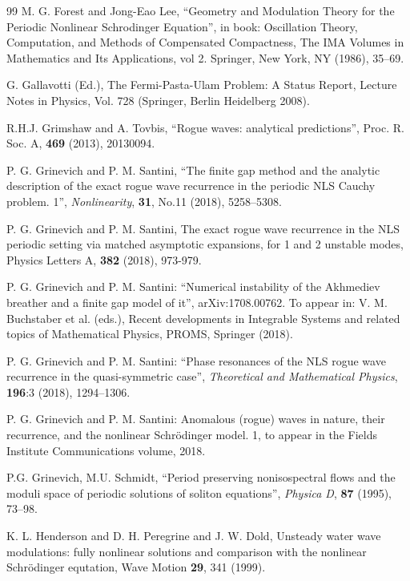 \documentclass[12pt]{article}
\begin{document}
\begin{thebibliography}{99}
 M. G. Forest and Jong-Eao Lee, ``Geometry and Modulation Theory for the Periodic Nonlinear Schrodinger Equation'', in book: Oscillation Theory, Computation, and Methods of Compensated Compactness, The IMA Volumes in Mathematics and Its Applications, vol 2. Springer, New York, NY (1986), 35--69. 
 
 G. Gallavotti (Ed.), The Fermi-Pasta-Ulam Problem: A Status Report, Lecture Notes in Physics, Vol. 728 (Springer, Berlin Heidelberg 2008).

 R.H.J. Grimshaw and A. Tovbis, ``Rogue waves: analytical predictions'', Proc. R. Soc. A, {\bf 469} (2013), 20130094.

 P. G. Grinevich and P. M. Santini, ``The finite gap method and the analytic description of the exact rogue wave recurrence in the periodic NLS Cauchy problem. 1'',  \textit{Nonlinearity}, \textbf{31}, No.11 (2018), 5258--5308.

 P. G. Grinevich and P. M. Santini, The exact rogue wave recurrence in the NLS periodic setting via matched asymptotic expansions, for 1 and 2 unstable modes, Physics Letters A, \textbf{382} (2018), 973-979.

 P. G. Grinevich and P. M. Santini: ``Numerical instability of the Akhmediev breather and a finite gap model of it'', arXiv:1708.00762. To appear in: V. M. Buchstaber et al. (eds.), Recent developments in Integrable Systems and related topics of Mathematical Physics, PROMS, Springer (2018).

 P. G. Grinevich and P. M. Santini: ``Phase resonances of the NLS rogue wave recurrence in the quasi-symmetric case'', \textit{Theoretical and Mathematical Physics}, \textbf{196}:3 (2018), 1294--1306. 

 P. G. Grinevich and P. M. Santini: Anomalous (rogue) waves in nature, their recurrence, and the nonlinear Schr\"odinger model. 1, to appear in the Fields Institute Communications volume, 2018.


 P.G. Grinevich, M.U. Schmidt, ``Period preserving nonisospectral flows and the moduli space of periodic solutions of soliton equations'', \textit{Physica D}, \textbf{87} (1995), 73--98.

 K. L. Henderson and D. H. Peregrine and J. W. Dold, Unsteady water wave modulations: fully nonlinear solutions and comparison with the nonlinear Schr\"odinger equtation, Wave Motion {\bf 29}, 341 (1999).  


\end{thebibliography}
\end{document}
